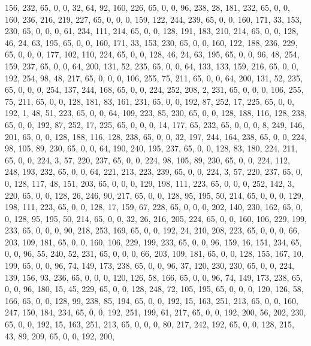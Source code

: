 \begin{DoxyCode}
       156, 232, 65, 0, 0, 32, 64, 92, 160, 226, 65, 0, 0, 96, 238, 28, 181, 232, 65, 0, 0, 160, 236, 216, 219, 227,
       65, 0, 0, 0, 159, 122, 244, 239, 65, 0, 0, 160, 171, 33, 153, 230, 65, 0, 0, 0, 61, 234, 111, 214, 65, 0,
       0, 128, 191, 183, 210, 214, 65, 0, 0, 128, 46, 24, 63, 195, 65, 0, 0, 160, 171, 33, 153, 230, 65, 0, 0, 160,
       122, 188, 236, 229, 65, 0, 0, 0, 177, 102, 110, 224, 65, 0, 0, 128, 46, 24, 63, 195, 65, 0, 0, 96, 48, 254,
       159, 237, 65, 0, 0, 64, 200, 131, 52, 235, 65, 0, 0, 64, 133, 133, 159, 216, 65, 0, 0, 192, 254, 98, 48,
       217, 65, 0, 0, 0, 106, 255, 75, 211, 65, 0, 0, 64, 200, 131, 52, 235, 65, 0, 0, 0, 254, 137, 244, 168, 65, 0,
       0, 224, 252, 208, 2, 231, 65, 0, 0, 0, 106, 255, 75, 211, 65, 0, 0, 128, 181, 83, 161, 231, 65, 0, 0, 192,
       87, 252, 17, 225, 65, 0, 0, 192, 1, 48, 51, 223, 65, 0, 0, 64, 109, 223, 85, 230, 65, 0, 0, 128, 188, 116,
       128, 238, 65, 0, 0, 192, 87, 252, 17, 225, 65, 0, 0, 0, 14, 177, 65, 232, 65, 0, 0, 0, 8, 249, 146, 201, 65, 0,
       0, 128, 188, 116, 128, 238, 65, 0, 0, 32, 197, 244, 164, 238, 65, 0, 0, 224, 98, 105, 89, 230, 65, 0, 0,
       64, 190, 240, 195, 237, 65, 0, 0, 128, 83, 180, 224, 211, 65, 0, 0, 224, 3, 57, 220, 237, 65, 0, 0, 224, 98,
       105, 89, 230, 65, 0, 0, 224, 112, 248, 193, 232, 65, 0, 0, 64, 221, 213, 223, 239, 65, 0, 0, 224, 3, 57, 220,
       237, 65, 0, 0, 128, 117, 48, 151, 203, 65, 0, 0, 0, 129, 198, 111, 223, 65, 0, 0, 0, 252, 142, 3, 220, 65,
       0, 0, 128, 26, 246, 90, 217, 65, 0, 0, 128, 95, 195, 50, 214, 65, 0, 0, 0, 129, 198, 111, 223, 65, 0, 0,
       128, 17, 159, 67, 228, 65, 0, 0, 0, 202, 140, 230, 162, 65, 0, 0, 128, 95, 195, 50, 214, 65, 0, 0, 32, 26, 216,
       205, 224, 65, 0, 0, 160, 106, 229, 199, 233, 65, 0, 0, 0, 90, 218, 253, 169, 65, 0, 0, 192, 24, 210, 208,
       223, 65, 0, 0, 0, 66, 203, 109, 181, 65, 0, 0, 160, 106, 229, 199, 233, 65, 0, 0, 96, 159, 16, 151, 234, 65,
       0, 0, 96, 55, 240, 52, 231, 65, 0, 0, 0, 66, 203, 109, 181, 65, 0, 0, 128, 155, 167, 10, 199, 65, 0, 0, 96,
       74, 149, 173, 238, 65, 0, 0, 96, 37, 120, 230, 230, 65, 0, 0, 224, 139, 156, 93, 236, 65, 0, 0, 0, 120, 126,
       58, 166, 65, 0, 0, 96, 74, 149, 173, 238, 65, 0, 0, 96, 180, 15, 45, 229, 65, 0, 0, 128, 248, 72, 105, 195,
       65, 0, 0, 0, 120, 126, 58, 166, 65, 0, 0, 128, 99, 238, 85, 194, 65, 0, 0, 192, 15, 163, 251, 213, 65, 0,
       0, 160, 247, 150, 184, 234, 65, 0, 0, 192, 251, 199, 61, 217, 65, 0, 0, 192, 200, 56, 202, 230, 65, 0, 0,
       192, 15, 163, 251, 213, 65, 0, 0, 0, 80, 217, 242, 192, 65, 0, 0, 128, 215, 43, 89, 209, 65, 0, 0, 192, 200,

\end{DoxyCode}
